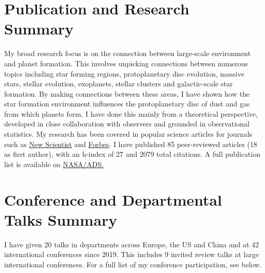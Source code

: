 \documentclass[12pt,a4paper, colorlinks = true,
            linkcolor = blue,
            urlcolor  = blue,
            citecolor = blue,
            anchorcolor = blue]{moderncv}
\begin{document}

\vspace{-12pt}
\section{Publication and Research Summary}

My broad research focus is on the connection between large-scale environment and planet formation. This involves unpicking connections between numerous topics including star forming regions, protoplanetary disc evolution, massive stars, stellar evolution, exoplanets, stellar clusters and galactic-scale star formation. By making connections between these areas, I have shown how the star formation environment influences the protoplanetary disc of dust and gas from which planets form. I have done this mainly from a theoretical perspective, developed in close collaboration with observers and grounded in observational statistics. My research has been covered in popular science articles for journals such as \href{https://www.newscientist.com/article/2258843-exoplanets-that-orbit-close-to-their-star-may-have-been-pushed-there/}{New Scientist} and \href{https://www.forbes.com/sites/brucedorminey/2024/06/06/new-paper-shakes-up-current-theories-of-planet-formation/}{Forbes}. I have published 85 peer-reviewed articles (18 as first author), with an h-index of 27 and 2079 total citations. A full publication list is available on \href{https://ui.adsabs.harvard.edu/user/libraries/PK0RWOWOTIKWfo-5Fck9sg}{NASA/ADS.} \\

\vspace{-12pt}
\section{Conference and Departmental Talks Summary}

I have given 20 talks in departments across Europe, the US and China and at 42 international conferences since 2019. This includes 9 invited review talks at large international conferences. For a full list of my conference participation, see below. 

\vspace{-3pt}
\end{document}
